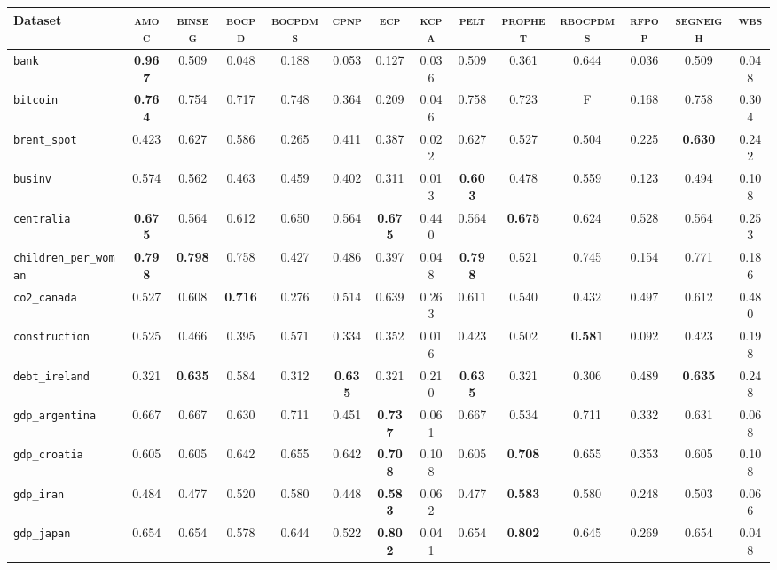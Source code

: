 \begin{tabular}{lccccccccccccc}
Dataset & \textsc{amoc} & \textsc{binseg} & \textsc{bocpd} & \textsc{bocpdms} & \textsc{cpnp} & \textsc{ecp} & \textsc{kcpa} & \textsc{pelt} & \textsc{prophet} & \textsc{rbocpdms} & \textsc{rfpop} & \textsc{segneigh} & \textsc{wbs}\\
\hline
\verb+bank+ & \textbf{0.967} & 0.509 & 0.048 & 0.188 & 0.053 & 0.127 & 0.036 & 0.509 & 0.361 & 0.644 & 0.036 & 0.509 & 0.048\\
\verb+bitcoin+ & \textbf{0.764} & 0.754 & 0.717 & 0.748 & 0.364 & 0.209 & 0.046 & 0.758 & 0.723 & F & 0.168 & 0.758 & 0.304\\
\verb+brent_spot+ & 0.423 & 0.627 & 0.586 & 0.265 & 0.411 & 0.387 & 0.022 & 0.627 & 0.527 & 0.504 & 0.225 & \textbf{0.630} & 0.242\\
\verb+businv+ & 0.574 & 0.562 & 0.463 & 0.459 & 0.402 & 0.311 & 0.013 & \textbf{0.603} & 0.478 & 0.559 & 0.123 & 0.494 & 0.108\\
\verb+centralia+ & \textbf{0.675} & 0.564 & 0.612 & 0.650 & 0.564 & \textbf{0.675} & 0.440 & 0.564 & \textbf{0.675} & 0.624 & 0.528 & 0.564 & 0.253\\
\verb+children_per_woman+ & \textbf{0.798} & \textbf{0.798} & 0.758 & 0.427 & 0.486 & 0.397 & 0.048 & \textbf{0.798} & 0.521 & 0.745 & 0.154 & 0.771 & 0.186\\
\verb+co2_canada+ & 0.527 & 0.608 & \textbf{0.716} & 0.276 & 0.514 & 0.639 & 0.263 & 0.611 & 0.540 & 0.432 & 0.497 & 0.612 & 0.480\\
\verb+construction+ & 0.525 & 0.466 & 0.395 & 0.571 & 0.334 & 0.352 & 0.016 & 0.423 & 0.502 & \textbf{0.581} & 0.092 & 0.423 & 0.198\\
\verb+debt_ireland+ & 0.321 & \textbf{0.635} & 0.584 & 0.312 & \textbf{0.635} & 0.321 & 0.210 & \textbf{0.635} & 0.321 & 0.306 & 0.489 & \textbf{0.635} & 0.248\\
\verb+gdp_argentina+ & 0.667 & 0.667 & 0.630 & 0.711 & 0.451 & \textbf{0.737} & 0.061 & 0.667 & 0.534 & 0.711 & 0.332 & 0.631 & 0.068\\
\verb+gdp_croatia+ & 0.605 & 0.605 & 0.642 & 0.655 & 0.642 & \textbf{0.708} & 0.108 & 0.605 & \textbf{0.708} & 0.655 & 0.353 & 0.605 & 0.108\\
\verb+gdp_iran+ & 0.484 & 0.477 & 0.520 & 0.580 & 0.448 & \textbf{0.583} & 0.062 & 0.477 & \textbf{0.583} & 0.580 & 0.248 & 0.503 & 0.066\\
\verb+gdp_japan+ & 0.654 & 0.654 & 0.578 & 0.644 & 0.522 & \textbf{0.802} & 0.041 & 0.654 & \textbf{0.802} & 0.645 & 0.269 & 0.654 & 0.048\\

\end{tabular}
